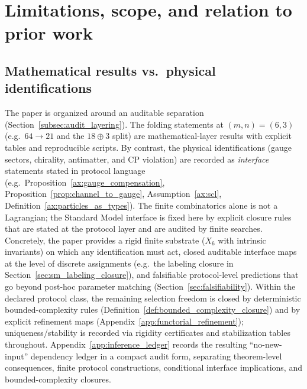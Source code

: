 \section{Limitations, scope, and relation to prior work}
\label{sec:limitations_related_work}

\subsection{Mathematical results vs.\ physical identifications}
The paper is organized around an auditable separation (Section~\ref{subsec:audit_layering}).
The folding statements at $(m,n)=(6,3)$ (e.g.\ $64\to 21$ and the $18\oplus 3$ split) are mathematical-layer results with explicit tables and reproducible scripts.
By contrast, the physical identifications (gauge sectors, chirality, antimatter, and CP violation) are recorded as \emph{interface} statements stated in protocol language (e.g.\ Proposition~\ref{ax:gauge_compensation}, Proposition~\ref{prop:channel_to_gauge}, Assumption~\ref{ax:scl}, Definition~\ref{ax:particles_as_types}).
The finite combinatorics alone is not a Lagrangian; the Standard Model interface is fixed here by explicit closure rules that are stated at the protocol layer and are audited by finite searches.
Concretely, the paper provides a rigid finite substrate ($X_6$ with intrinsic invariants) on which any identification must act, closed auditable interface maps at the level of discrete assignments (e.g.\ the labeling closure in Section~\ref{sec:sm_labeling_closure}), and falsifiable protocol-level predictions that go beyond post-hoc parameter matching (Section~\ref{sec:falsifiability}).
Within the declared protocol class, the remaining selection freedom is closed by deterministic bounded-complexity rules (Definition~\ref{def:bounded_complexity_closure}) and by explicit refinement maps (Appendix~\ref{app:functorial_refinement}); uniqueness/stability is recorded via rigidity certificates and stabilization tables throughout.
Appendix~\ref{app:inference_ledger} records the resulting ``no-new-input'' dependency ledger in a compact audit form, separating theorem-level consequences, finite protocol constructions, conditional interface implications, and bounded-complexity closures.

